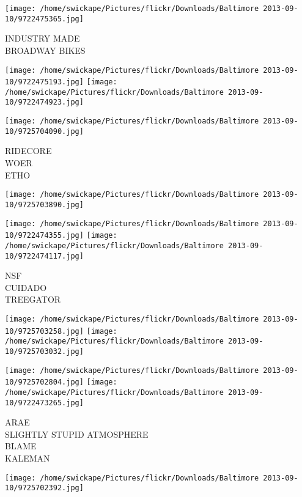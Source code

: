 \documentclass[10pt,letterpaper]{article}
\begin{document}
\vspace{0.25in}
\texttt{[image: /home/swickape/Pictures/flickr/Downloads/Baltimore 2013-09-10/9722475365.jpg]}

INDUSTRY MADE\\
BROADWAY BIKES\\
\pagebreak

\texttt{[image: /home/swickape/Pictures/flickr/Downloads/Baltimore 2013-09-10/9722475193.jpg]}
\texttt{[image: /home/swickape/Pictures/flickr/Downloads/Baltimore 2013-09-10/9722474923.jpg]}

\texttt{[image: /home/swickape/Pictures/flickr/Downloads/Baltimore 2013-09-10/9725704090.jpg]}

RIDECORE\\
WOER\\
ETHO\\
\pagebreak

\texttt{[image: /home/swickape/Pictures/flickr/Downloads/Baltimore 2013-09-10/9725703890.jpg]}

\vspace{0.25in}
\texttt{[image: /home/swickape/Pictures/flickr/Downloads/Baltimore 2013-09-10/9722474355.jpg]}
\texttt{[image: /home/swickape/Pictures/flickr/Downloads/Baltimore 2013-09-10/9722474117.jpg]}

NSF\\
CUIDADO\\
TREEGATOR\\
\pagebreak

\texttt{[image: /home/swickape/Pictures/flickr/Downloads/Baltimore 2013-09-10/9725703258.jpg]}
\texttt{[image: /home/swickape/Pictures/flickr/Downloads/Baltimore 2013-09-10/9725703032.jpg]}

\texttt{[image: /home/swickape/Pictures/flickr/Downloads/Baltimore 2013-09-10/9725702804.jpg]}
\texttt{[image: /home/swickape/Pictures/flickr/Downloads/Baltimore 2013-09-10/9722473265.jpg]}

ARAE\\
SLIGHTLY STUPID ATMOSPHERE\\
BLAME\\
KALEMAN\\
\pagebreak

\texttt{[image: /home/swickape/Pictures/flickr/Downloads/Baltimore 2013-09-10/9725702392.jpg]}
\end{document}
